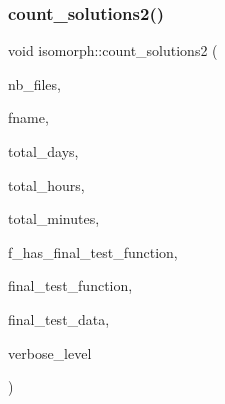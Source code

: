 \subsubsection{\texorpdfstring{count\+\_\+solutions2()}{count\_solutions2()}}
{\footnotesize\ttfamily void isomorph\+::count\+\_\+solutions2 (\begin{DoxyParamCaption}\item[{\mbox{\hyperlink{galois_8h_a09fddde158a3a20bd2dcadb609de11dc}{I\+NT}}}]{nb\+\_\+files,  }\item[{const \mbox{\hyperlink{galois_8h_ab6cc7b4aeb6ea31aba2b3fbfc83ff5e6}{B\+Y\+TE}} $\ast$$\ast$}]{fname,  }\item[{\mbox{\hyperlink{galois_8h_a09fddde158a3a20bd2dcadb609de11dc}{I\+NT}} \&}]{total\+\_\+days,  }\item[{\mbox{\hyperlink{galois_8h_a09fddde158a3a20bd2dcadb609de11dc}{I\+NT}} \&}]{total\+\_\+hours,  }\item[{\mbox{\hyperlink{galois_8h_a09fddde158a3a20bd2dcadb609de11dc}{I\+NT}} \&}]{total\+\_\+minutes,  }\item[{\mbox{\hyperlink{galois_8h_a09fddde158a3a20bd2dcadb609de11dc}{I\+NT}}}]{f\+\_\+has\+\_\+final\+\_\+test\+\_\+function,  }\item[{\mbox{\hyperlink{galois_8h_a09fddde158a3a20bd2dcadb609de11dc}{I\+NT}}($\ast$)(\mbox{\hyperlink{galois_8h_a09fddde158a3a20bd2dcadb609de11dc}{I\+NT}} $\ast$data, \mbox{\hyperlink{galois_8h_a09fddde158a3a20bd2dcadb609de11dc}{I\+NT}} sz, void $\ast$final\+\_\+test\+\_\+data, \mbox{\hyperlink{galois_8h_a09fddde158a3a20bd2dcadb609de11dc}{I\+NT}} \mbox{\hyperlink{simeon_8_c_a818073fbcc2f439e7c56952f67386122}{verbose\+\_\+level}})}]{final\+\_\+test\+\_\+function,  }\item[{void $\ast$}]{final\+\_\+test\+\_\+data,  }\item[{\mbox{\hyperlink{galois_8h_a09fddde158a3a20bd2dcadb609de11dc}{I\+NT}}}]{verbose\+\_\+level }\end{DoxyParamCaption})}

\mbox{\label{classisomorph_ab5efb4a88dd31fb201862f5aba34c31d}} 
